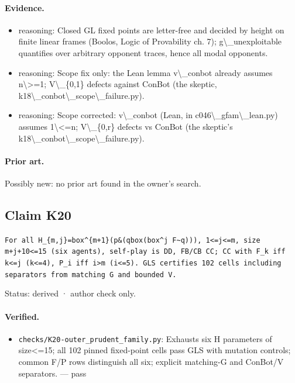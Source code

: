 \documentclass{article}
\begin{document}
\paragraph{Evidence.}
\begin{itemize}
\item reasoning: Closed GL fixed points are letter-free and decided by height on finite linear frames (Boolos, Logic of Provability ch. 7); g\textbackslash{}\_unexploitable quantifies over arbitrary opponent traces, hence all modal opponents.
\item reasoning: Scope fix only: the Lean lemma v\textbackslash{}\_conbot already assumes n\textbackslash{}\textgreater{}=1; V\textbackslash{}\_\{0,1\} defects against ConBot (the skeptic, k18\textbackslash{}\_conbot\textbackslash{}\_scope\textbackslash{}\_failure.py).
\item reasoning: Scope corrected: v\textbackslash{}\_conbot (Lean, in c046\textbackslash{}\_gfam\textbackslash{}\_lean.py) assumes 1\textbackslash{}\textless{}=n; V\textbackslash{}\_\{0,r\} defects vs ConBot (the skeptic's k18\textbackslash{}\_conbot\textbackslash{}\_scope\textbackslash{}\_failure.py).
\end{itemize}

\paragraph{Prior art.} Possibly new: no prior art found in the owner's search.

\subsection*{Claim K20}

\texttt{For all H\_\{m,j\}=box\textasciicircum{}\{m+1\}(p\&(q\textbar{}box(box\textasciicircum{}j F\textbar{}\textasciitilde{}q))), 1\textless{}=j\textless{}=m, size m+j+10\textless{}=15 (six agents), self-play is DD, FB/CB CC; CC with F\_k iff k\textless{}=j (k\textless{}=4), P\_i iff i\textgreater{}m (i\textless{}=5). GLS certifies 102 cells including separators from matching G and bounded V.}

Status: derived · author check only.

\paragraph{Verified.}
\begin{itemize}
\item \texttt{checks/K20-outer\_prudent\_family.py}: Exhausts six H parameters of size\textless{}=15; all 102 pinned fixed-point cells pass GLS with mutation controls; common F/P rows distinguish all six; explicit matching-G and ConBot/V separators. --- pass
\end{itemize}
\end{document}
